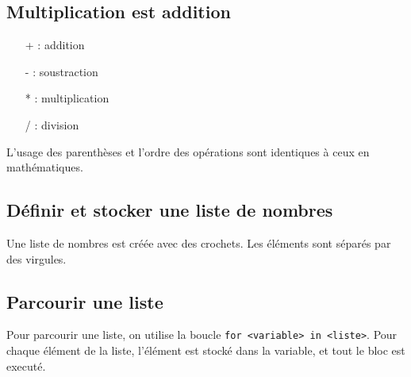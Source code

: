 \subsection*{Multiplication est addition}

\begin{multicols}{2}
	\begin{enumerate}
		\item[+] : addition
		\item[-] : soustraction
		\item[*] : multiplication
		\item[/] : division
	\end{enumerate}
	
	L'usage des parenthèses et l'ordre des opérations sont identiques à ceux en mathématiques.
		
	\columnbreak
	\centering
	\begin{minipage}{.1\textwidth}
	\end{minipage}
\end{multicols}

\subsection*{Définir et stocker une liste de nombres}

\begin{multicols}{2}
	Une liste de nombres est créée avec des crochets. Les éléments sont séparés par des virgules.

	\columnbreak
	\centering
	\begin{minipage}{.2\textwidth}
	\end{minipage}
\end{multicols}

\subsection*{Parcourir une liste}

\begin{multicols}{2}
	Pour parcourir une liste, on utilise la boucle \texttt{for <variable> in <liste>}.
	Pour chaque élément de la liste, l'élément est stocké dans la variable, et tout le bloc est executé.
	
	\columnbreak
	\centering
	\begin{minipage}{.3\textwidth}
	\end{minipage}
\end{multicols}

